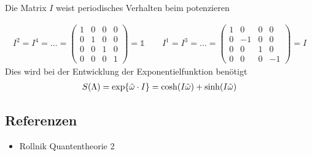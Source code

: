 Die Matrix \(I\) weist periodisches Verhalten beim potenzieren

\begin{align}
  \label{eq:41}
  I^2= I^4=\dots= \begin{pmatrix}1&0&0&0\\0&1&0&0\\ 0&0&1&0\\0&0&0&1 \end{pmatrix}=\mathds 1 \qquad 
 I^1= I^3=\dots= \begin{pmatrix}1&0&0&0\\0&-1&0&0\\ 0&0&1&0\\0&0&0&-1 \end{pmatrix}=I 
\end{align}
Dies wird bei der Entwicklung der Exponentielfunktion benötigt
\begin{align}
  \label{eq:42}
   S(\Lambda) &= \exp\{ \tilde\omega \cdot I \} = \cosh(I\tilde\omega) + \sinh(I\tilde\omega) \notag\\
\end{align}


\subsection*{Referenzen}
\begin{itemize}
\item Rollnik Quantentheorie 2
\end{itemize}


